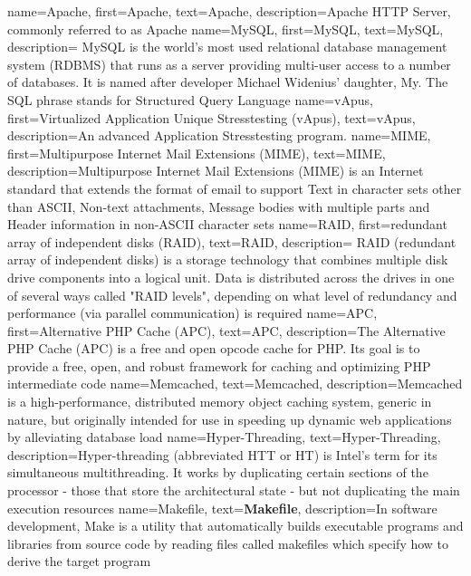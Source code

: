 {
	name={Apache},
	first={Apache},
	text={Apache},
	description={Apache HTTP Server, commonly referred to as Apache}
}
{
	name={MySQL},
	first={MySQL},
	text={MySQL},
	description={
	MySQL is the world's most used relational database management system (RDBMS) that runs as a server providing multi-user access to a number of databases. It is named after developer Michael Widenius' daughter, My. The SQL phrase stands for Structured Query Language}
}
{
	name={vApus},
	first={Virtualized Application Unique Stresstesting (vApus)},
	text={vApus},
	description={An advanced Application Stresstesting program.}
}
{
	name={MIME},
	first={Multipurpose Internet Mail Extensions (MIME)},
	text={MIME},
	description={Multipurpose Internet Mail Extensions (MIME) is an Internet standard that extends the format of email to support   
		Text in character sets other than ASCII, Non-text attachments, 	Message bodies with multiple parts and Header information in non-ASCII character sets
	}
}
{
	name={RAID},
	first={redundant array of independent disks (RAID)},
	text={RAID},
	description={
	RAID (redundant array of independent disks) is a storage technology that combines multiple disk drive components into a logical unit. Data is distributed across the drives in one of several ways called "RAID levels", depending on what level of redundancy and performance (via parallel communication) is required}
}
{
	name={APC},
	first={Alternative PHP Cache (APC)},
	text={APC},
	description={The Alternative PHP Cache (APC) is a free and open opcode cache for PHP. Its goal is to provide a free, open, and robust framework for caching and optimizing PHP intermediate code}
}
{
	name={Memcached},
	text={Memcached},
	description={Memcached is a high-performance, distributed memory object caching system, generic in nature, but originally intended for use in speeding up dynamic web applications by alleviating database load}
}
{
	name={Hyper-Threading},
	text={Hyper-Threading},
	description={Hyper-threading (abbreviated HTT or HT) is Intel's term for its simultaneous multithreading. It works by duplicating certain sections of the processor - those that store the architectural state - but not duplicating the main execution resources}
	}
{
	name={Makefile},
	text={\textbf{Makefile}},
	description={In software development, Make is a utility that automatically builds executable programs and libraries from source code by reading files called makefiles which specify how to derive the target program}
}
